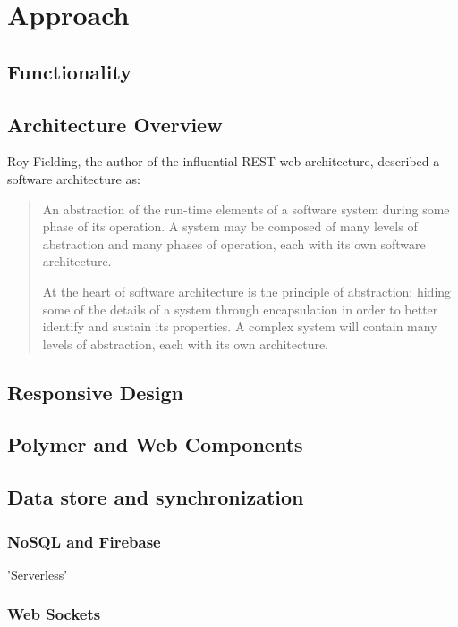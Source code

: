 \chapter{Approach}
%

\section{Functionality}

\section{Architecture Overview}
Roy Fielding, the author of the influential REST web architecture, described a software architecture as:

\begin{quote}
An abstraction of the run-time elements of a software system during some phase of its operation. A system may be composed of many levels of abstraction and many phases of operation, each with its own software architecture.

At the heart of software architecture is the principle of abstraction: hiding some of the details of a system through encapsulation in order to better identify and sustain its properties. A complex system will contain many levels of abstraction, each with its own architecture.~\cite{fielding2000}
\end{quote}


\section{Responsive Design}

\section{Polymer and Web Components}

\section{Data store and synchronization}
\subsection{NoSQL and Firebase}

'Serverless'

\subsection{Web Sockets}

